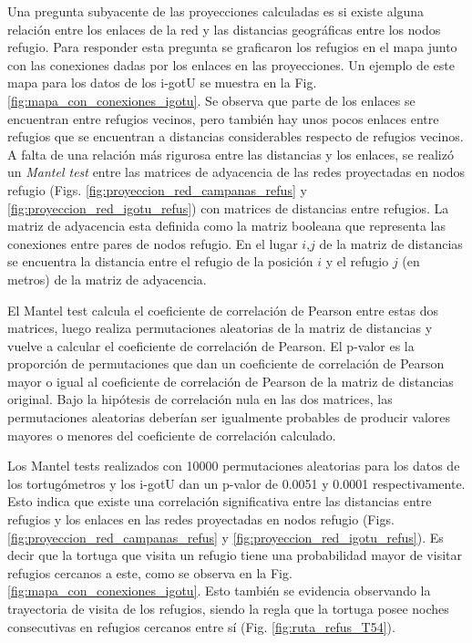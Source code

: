 Una pregunta subyacente de las proyecciones calculadas es si existe alguna relación entre los enlaces de la red y las distancias geográficas entre los nodos refugio. Para responder esta pregunta se graficaron los refugios en el mapa junto con las conexiones dadas por los enlaces en las proyecciones. Un ejemplo de este mapa para los datos de los i-gotU se muestra en la Fig. \ref{fig:mapa_con_conexiones_igotu}. Se observa que parte de los enlaces se encuentran entre refugios vecinos, pero también hay unos pocos enlaces entre refugios que se encuentran a distancias considerables respecto de refugios vecinos. A falta de una relación más rigurosa entre las distancias y los enlaces, se realizó un \textit{Mantel test} \cite{MantelTest} entre las matrices de adyacencia de las redes proyectadas en nodos refugio (Figs. \ref{fig:proyeccion_red_campanas_refus} y \ref{fig:proyeccion_red_igotu_refus}) con matrices de distancias entre refugios. La matriz de adyacencia esta definida como la matriz booleana que representa las conexiones entre pares de nodos refugio. En el lugar $i$,$j$ de la matriz de distancias se encuentra la distancia entre el refugio  de la posición $i$ y el refugio $j$ (en metros) de la matriz de adyacencia.
 
El Mantel test calcula el coeficiente de correlación de Pearson entre estas dos matrices, luego realiza permutaciones aleatorias de la matriz de distancias y vuelve a calcular el coeficiente de correlación de Pearson. El p-valor es la proporción de permutaciones que dan un coeficiente de correlación de Pearson mayor o igual al coeficiente de correlación de Pearson de la matriz de distancias original. Bajo la hipótesis de correlación nula en las dos matrices, las permutaciones aleatorias deberían ser igualmente probables de producir valores mayores o menores del coeficiente de correlación calculado.
 
 
Los Mantel tests realizados con 10000 permutaciones aleatorias para los datos de los tortugómetros y los i-gotU dan un p-valor de 0.0051 y 0.0001 respectivamente. Esto indica que existe una correlación significativa entre las distancias entre refugios y los enlaces en las redes proyectadas en nodos refugio (Figs. \ref{fig:proyeccion_red_campanas_refus} y \ref{fig:proyeccion_red_igotu_refus}). Es decir que la tortuga que visita un refugio tiene una probabilidad mayor de visitar refugios cercanos a este, como se observa en la Fig. \ref{fig:mapa_con_conexiones_igotu}. Esto también se evidencia observando la trayectoria de visita de los refugios, siendo la regla que la tortuga posee noches consecutivas en refugios cercanos entre sí (Fig. \ref{fig:ruta_refus_T54}).
 

